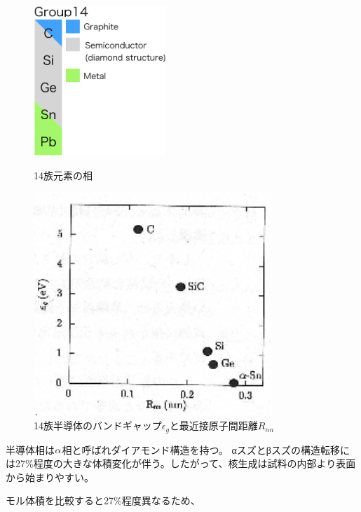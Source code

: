 \begin{figure}[!h]
 \begin{minipage}{0.4\hsize}
  \begin{center}
   \includegraphics[width=50mm]{Introduction/group14.eps}
  \end{center}
  \caption{14族元素の相}
  \label{fig:group14}
 \end{minipage}
 \begin{minipage}{0.6\hsize}
  \begin{center}
   \includegraphics[width=90mm]{Introduction/bandgaps.eps}
  \end{center}
  \caption{14族半導体のバンドギャップ$\epsilon_g$と最近接原子間距離$R_{nn}$\cite{Yonezawa}}
  \label{fig:bandgaps}
 \end{minipage}
\end{figure}



半導体相は$\rm \alpha$相と呼ばれダイアモンド構造を持つ。
αスズとβスズの構造転移には27\%程度の大きな体積変化が伴う。したがって、核生成は試料の内部より表面から始まりやすい\cite{Cornelius}。

モル体積を比較すると27\%程度異なるため、

